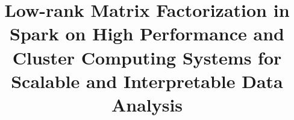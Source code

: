 \documentclass{acm_proc_article-sp}
\begin{document}
\title{Low-rank Matrix Factorization in Spark on High Performance and Cluster Computing Systems for Scalable and Interpretable Data Analysis}
%
%
%
%
%
\end{document}
